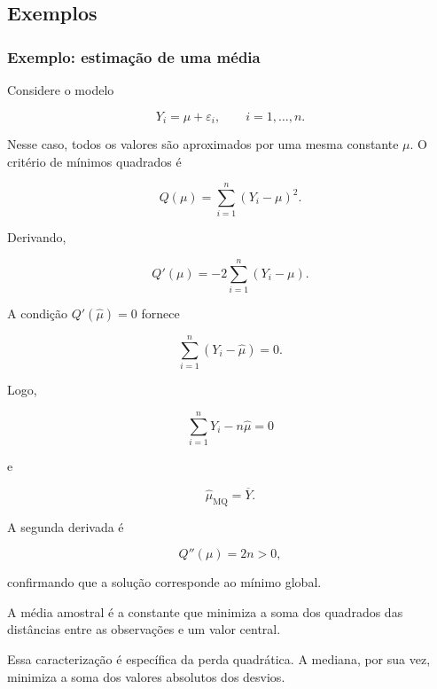 \documentclass[
  letterpaper,
  DIV=11,
  numbers=noendperiod]{scrreprt}
\begin{document}
\subsection{Exemplos}\label{exemplos-1}

\subsubsection{Exemplo: estimação de uma
média}\label{exemplo-estimauxe7uxe3o-de-uma-muxe9dia}

Considere o modelo

\[Y_i
=
\mu+\varepsilon_i,
\qquad i=1,\ldots,n.\]

Nesse caso, todos os valores são aproximados por uma mesma constante
\(\mu\). O critério de mínimos quadrados é

\[Q(\mu)
=
\sum_{i=1}^n
(Y_i-\mu)^2.\]

Derivando,

\[Q'(\mu)
=
-2
\sum_{i=1}^n
(Y_i-\mu).\]

A condição \(Q'(\widehat\mu)=0\) fornece

\[\sum_{i=1}^n(Y_i-\widehat\mu)=0.\]

Logo,

\[\sum_{i=1}^nY_i-n\widehat\mu=0\]

e

\[\boxed{\widehat\mu_{\mathrm{MQ}}=\overline Y}.\]

A segunda derivada é

\[Q''(\mu)=2n>0,\]

confirmando que a solução corresponde ao mínimo global.

\begin{tcolorbox}[enhanced jigsaw, colback=white, leftrule=.75mm, colbacktitle=quarto-callout-note-color!10!white, breakable, titlerule=0mm, bottomtitle=1mm, title=\textcolor{quarto-callout-note-color}{\faInfo}\hspace{0.5em}{Interpretação}, colframe=quarto-callout-note-color-frame, toprule=.15mm, opacityback=0, bottomrule=.15mm, opacitybacktitle=0.6, arc=.35mm, toptitle=1mm, rightrule=.15mm, coltitle=black, left=2mm]

A média amostral é a constante que minimiza a soma dos quadrados das
distâncias entre as observações e um valor central.

Essa caracterização é específica da perda quadrática. A mediana, por sua
vez, minimiza a soma dos valores absolutos dos desvios.

\end{tcolorbox}
\end{document}
